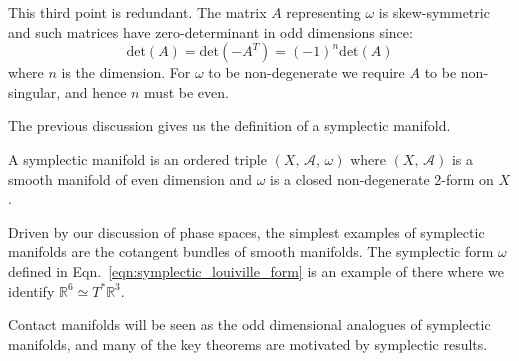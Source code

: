 This third point is redundant. The matrix $A$ representing $\omega$ is
skew-symmetric and such matrices have zero-determinant in odd dimensions
since:
\begin{equation}
    \textrm{det}(A)=\textrm{det}(-A^{T})=(-1)^{n}\textrm{det}(A)
\end{equation}
where $n$ is the dimension. For $\omega$ to be non-degenerate we require $A$
to be non-singular, and hence $n$ must be even.
\par\hfill\par
The previous discussion gives us the definition of a symplectic manifold.
\begin{definition}
    A symplectic manifold is an ordered triple $(X,\,\mathcal{A},\,\omega)$
    where $(X,\,\mathcal{A})$ is a smooth manifold of even dimension and
    $\omega$ is a closed non-degenerate 2-form on $X$.
\end{definition}
Driven by our discussion of phase spaces, the simplest examples of symplectic
manifolds are the cotangent bundles of smooth manifolds. The symplectic form
$\omega$ defined in Eqn.~\ref{eqn:symplectic_louiville_form} is an example
of there where we identify $\mathbb{R}^{6}\simeq{T}^{*}\mathbb{R}^{3}$.
\par\hfill\par
Contact manifolds will be seen as the odd dimensional analogues of symplectic
manifolds, and many of the key theorems are motivated by symplectic results.
